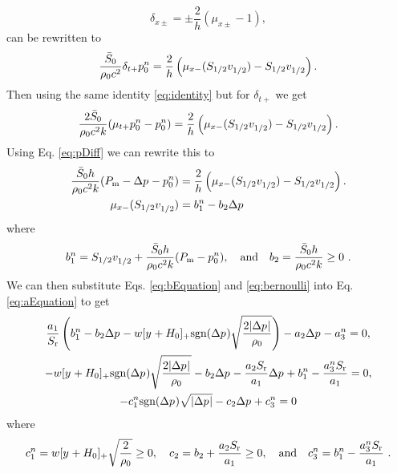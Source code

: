 \begin{equation}\label{eq:identity}
    \delta_{x\pm} = \pm\frac{2}{h}(\mu_{x\pm} - 1),
\end{equation} 
can be rewritten to
\begin{equation}
    \frac{\bar S_0}{\rho_0 c^2}\delta_{t+}p_0^n = \frac{2}{h} \left(\mu_{x-}(S_{1/2}v_{1/2}^{})-S_{1/2}v_{1/2}^{}\right).
\end{equation}
Then using the same identity \eqref{eq:identity} but for $\delta_{t+}$ we get
\begin{equation}
    \frac{2\bar S_0}{\rho_0 c^2k}(\mu_{t+}p_0^n-p_0^n) = \frac{2}{h} \left(\mu_{x-}(S_{1/2}v_{1/2}^{})-S_{1/2}v_{1/2}^{}\right).
\end{equation}
Using Eq. \eqref{eq:pDiff} we can rewrite this to
\begin{align}
    \frac{\bar S_0h}{\rho_0 c^2k}(P_\text{m} - \Delta p^{}-p_0^n) &= \frac{2}{h} \left(\mu_{x-}(S_{1/2}v_{1/2}^{})-S_{1/2}v_{1/2}^{}\right).\nonumber\\
    \mu_{x-}(S_{1/2}v_{1/2}^{}) &= b_1^n - b_2\Delta p^{}\label{eq:bEquation}
\end{align}
where
\begin{equation}\label{eq:bCoeffs}
    b_1^n = S_{1/2}v_{1/2}^{} + \frac{\bar S_0h}{\rho_0 c^2k} (P_\text{m} - p_0^n), \quad \text{and} \quad b_2 = \frac{\bar S_0h}{\rho_0 c^2k} \geq 0\ .
\end{equation}
We can then substitute Eqs. \eqref{eq:bEquation} and \eqref{eq:bernoulli} into Eq. \eqref{eq:aEquation} to get
\begin{gather}
    \frac{a_1}{S_\text{r}}\left(b_1^n - b_2\Delta p^{} - w[y^{}+H_0]_+\text{sgn}(\Delta p^{})\sqrt{\frac{2|\Delta p^{}|}{\rho_0}}\right) - a_2 \Delta p^{} - a_3^n = 0,\nonumber\\
    - w[y^{}+H_0]_+\text{sgn}(\Delta p^{})\sqrt{\frac{2|\Delta p^{}|}{\rho_0}} - b_2\Delta p^{} - \frac{a_2S_\text{r}}{a_1} \Delta p^{} + b_1^n - \frac{a_3^nS_\text{r}}{a_1} = 0,\nonumber\\
    -c_1^n\text{sgn}(\Delta p^{})\sqrt{|\Delta p^{}|} - c_2\Delta p^{} + c_3^n = 0\label{eq:cEquation}
\end{gather}
where
\begin{equation}\label{eq:cCoeffs}
    c_1^n = w[y^{} + H_0]_+\sqrt{\frac{2}{\rho_0}} \geq 0, \quad c_2 = b_2 + \frac{a_2S_\text{r}}{a_1} \geq 0, \quad \text{and}\quad c_3^n = b_1^n - \frac{a_3^nS_\text{r}}{a_1}\ .
\end{equation}
